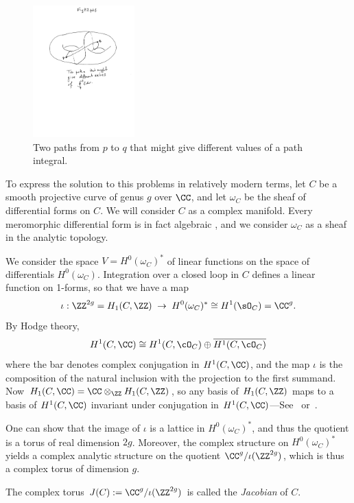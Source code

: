 \begin{figure}
 \caption{Two paths from $p$ to $q$ that might give different values of a path integral.}
\centerline {\includegraphics[height=2in]{"Fig4.2.pdf"}}
\end{figure}

To express the solution to this problems in relatively modern terms, let $C$ be a smooth projective curve of genus $g$ over $\CC$, and let $\omega_{C}$ be the sheaf of differential forms on $C$. We will consider $C$ as a complex manifold. Every meromorphic differential form is in fact algebraic
\cite{SerreGAGA}, and we consider $\omega_{C}$ as a sheaf in the analytic topology.

We consider the space $V = H^0(\omega_C)^*$ of linear functions on the space of differentials $H^0(\omega_C)$.  Integration over a closed loop in $C$ defines a linear function on 1-forms, so that we have a map
$$
\iota: \ZZ^{2g} = H_1(C,\ZZ) \; \to \;  H^0(\omega_C)^* \cong H^1(\sO_C) = \CC^{g}.
$$
By Hodge theory, 
$$
H^1(C, \CC) \cong H^1(C, \cO_C) \oplus \overline{H^1(C, \cO_C)}
$$
where the bar denotes complex conjugation in $H^1(C, \CC)$, and the map $\iota$ is the composition of 
 the natural inclusion with the projection to the first summand.
 Now
$H_1(C,\CC) = \CC\otimes_\ZZ H_1(C,\ZZ)$, so any basis of $H_1(C,\ZZ)$ maps to a basis of 
 $H^1(C, \CC)$ invariant under conjugation in $H^1(C, \CC)$---See~\cite{Voisin} or~\cite[p. 116]{Griffiths-Harris1978}. 

One can show that the image of $\iota$ is a lattice in $H^0(\omega_C)^*$, and thus the quotient
is a torus of real dimension $2g$. Moreover, the
complex structure on $H^0(\omega_C)^*$ yields a complex analytic structure on the quotient $\CC^{g}/\iota(\ZZ^{2g})$, which is thus a complex torus of  dimension $g$.  

\begin{definition}
 The complex torus $J(C) := \CC^{g}/\iota(\ZZ^{2g})$ is called the \emph{Jacobian} of $C$.
\end{definition}

